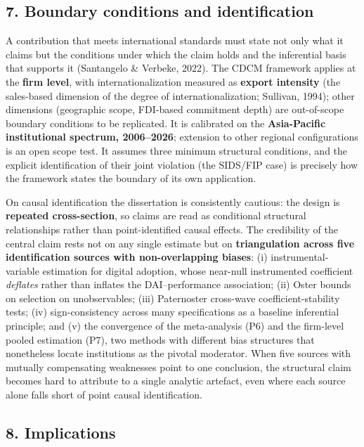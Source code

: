 \documentclass[
  a4paper,
  13pt]{extreport}
\begin{document}
\hypertarget{boundary-conditions-and-identification}{%
\subsection{7. Boundary conditions and
identification}\label{boundary-conditions-and-identification}}

A contribution that meets international standards must state not only
what it claims but the conditions under which the claim holds and the
inferential basis that supports it (Santangelo \& Verbeke, 2022). The
CDCM framework applies at the \textbf{firm level}, with
internationalization measured as \textbf{export intensity} (the
sales-based dimension of the degree of internationalization; Sullivan,
1994); other dimensions (geographic scope, FDI-based commitment depth)
are out-of-scope boundary conditions to be replicated. It is calibrated
on the \textbf{Asia-Pacific institutional spectrum, 2006--2026};
extension to other regional configurations is an open scope test. It
assumes three minimum structural conditions, and the explicit
identification of their joint violation (the SIDS/FIP case) is precisely
how the framework states the boundary of its own application.

On causal identification the dissertation is consistently cautious: the
design is \textbf{repeated cross-section}, so claims are read as
conditional structural relationships rather than point-identified causal
effects. The credibility of the central claim rests not on any single
estimate but on \textbf{triangulation across five identification sources
with non-overlapping biases}: (i) instrumental-variable estimation for
digital adoption, whose near-null instrumented coefficient
\emph{deflates} rather than inflates the DAI--performance association;
(ii) Oster bounds on selection on unobservables; (iii) Paternoster
cross-wave coefficient-stability tests; (iv) sign-consistency across
many specifications as a baseline inferential principle; and (v) the
convergence of the meta-analysis (P6) and the firm-level pooled
estimation (P7), two methods with different bias structures that
nonetheless locate institutions as the pivotal moderator. When five
sources with mutually compensating weaknesses point to one conclusion,
the structural claim becomes hard to attribute to a single analytic
artefact, even where each source alone falls short of point causal
identification.

\hypertarget{implications}{%
\subsection{8. Implications}\label{implications}}
\end{document}
